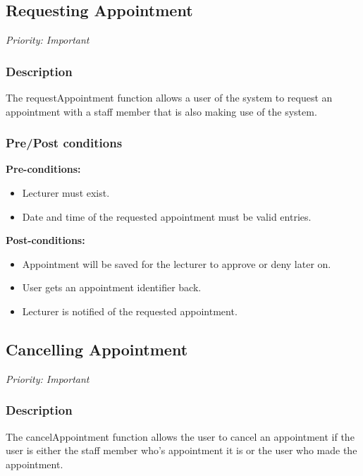 \subsection{Requesting Appointment}
\textit{Priority: Important} \\

\subsubsection{Description}
The requestAppointment function allows a user of the system to request an appointment with a staff member that is also making use of the system. \\

\subsubsection{Pre/Post conditions}
\textbf{Pre-conditions:} 
	\begin{itemize}
		\item Lecturer must exist.
		\item Date and time of the requested appointment must be valid entries.
	\end{itemize}
\textbf{Post-conditions:} 
	\begin{itemize}
		\item Appointment will be saved for the lecturer to approve or deny later on.
		\item User gets an appointment identifier back.
		\item Lecturer is notified of the requested appointment. 
	\end{itemize}



\subsection{Cancelling Appointment}
\textit{Priority: Important} \\

\subsubsection{Description}
The cancelAppointment function allows the user to cancel an appointment if the user is either the staff member who's appointment it is or the user who made the appointment. \\

